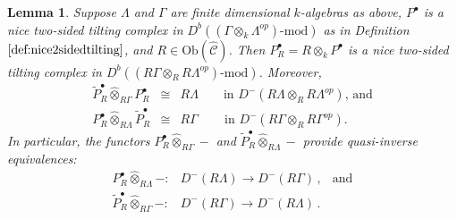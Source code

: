 \documentclass{amsart}
\theoremstyle{plain}
\newtheorem{lemma}[thm]{Lemma}
\theoremstyle{definition}
\theoremstyle{remark}
\begin{document}
\begin{lemma}
\label{lem:lifting} 
Suppose $\Lambda$ and $\Gamma$ are finite dimensional $k$-algebras as above,
$P^\bullet$ is a nice two-sided tilting complex in 
$D^b((\Gamma\otimes_k\Lambda^{op})\mbox{-$\mathrm{mod}$})$ 
as in Definition $\ref{def:nice2sidedtilting}$, and
$R\in\mathrm{Ob}(\hat{\mathcal{C}})$. Then $P_R^\bullet=R\otimes_k
P^\bullet$ is a nice two-sided tilting complex in 
$D^b((R\Gamma\otimes_R R\Lambda^{op})\mbox{-$\mathrm{mod}$})$.
Moreover, 
\begin{eqnarray}
\label{eq:useful} 
\widetilde{P}_R^\bullet \hat{\otimes}_{R\Gamma}P_R^\bullet
&\cong&  R\Lambda \qquad
\mbox{in $D^-(R\Lambda\otimes_R R\Lambda^{op})$, and}\\
P_R^\bullet \hat{\otimes}_{R\Lambda}\widetilde{P}_R^\bullet 
&\cong& R\Gamma \qquad\,
\mbox{in $D^-(R\Gamma\otimes_R R\Gamma^{op})$.} \nonumber
\end{eqnarray}
In particular, the functors $P_R^\bullet\hat{\otimes}_{R\Gamma}-$ and
$\widetilde{P}_R^\bullet\hat{\otimes}_{R\Lambda}-$ provide quasi-inverse equivalences: 
\begin{eqnarray}
\label{eq:quasiinverses}
P_R^\bullet \hat{\otimes}_{R\Lambda} -: &D^-(R\Lambda) \to
D^-(R\Gamma)\,,& \mbox{and}\\
\widetilde{P}_R^\bullet \hat{\otimes}_{R\Gamma} -: &D^-(R\Gamma)
\to D^-(R\Lambda)\,.& \nonumber
\end{eqnarray}
\end{lemma}
\end{document}
